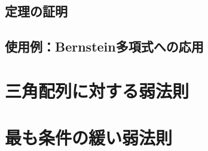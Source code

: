 \documentclass[dvipdfmx]{jsarticle}
\numberwithin{equation}{section}
\theoremstyle{definition}
\newcommand{\0}{\bm{0}}
\newcommand{\1}{\bm{1}}
\begin{document}
\subsection{定理の証明}

\subsection{使用例：Bernstein多項式への応用}


\section{三角配列に対する弱法則}


\section{最も条件の緩い弱法則}
\end{document}
